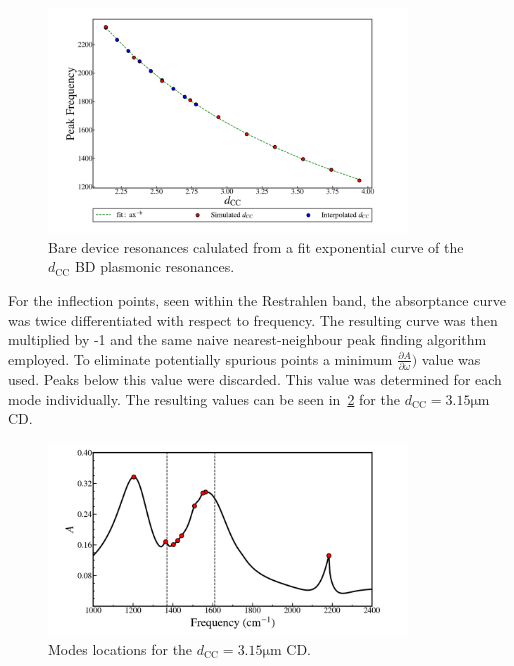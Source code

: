 \documentclass[preprint,
amsmath,amssymb,
aip,
jap,
floatfix,]{revtex4-2}
\begin{document}
			\begin{figure}[!htb]
			  \centering\includegraphics[width=0.85\textwidth]{Figures/NewDccvPeaksBare.png}
			  \caption{Bare device resonances calulated from a fit exponential curve of the $d_\mathrm{CC}$ BD plasmonic resonances.}
			  \label{fig:3.5}
			\end{figure}

			For the inflection points, seen within the Restrahlen band, the absorptance curve was twice differentiated with respect to frequency. The resulting curve was then multiplied by -1 and the same naive nearest-neighbour peak finding algorithm employed. To eliminate potentially spurious points a minimum $\frac{\partial A}{\partial \omega})$ value was used. Peaks below this value were discarded. This value was determined for each mode individually. The resulting values can be seen in~\ref{fig:3.6} for the $d_\mathrm{CC}=3.15 \si{\um}$ CD.


			\begin{figure}[!htb]
			  \centering\includegraphics[width=0.85\textwidth]{Figures/NewAbsPeaksCrossSi1000_2400.png}
			  \caption{Modes locations for the $d_\mathrm{CC}=3.15 \si{\um}$ CD.}
			  \label{fig:3.6}
			\end{figure}
			
\end{document}

